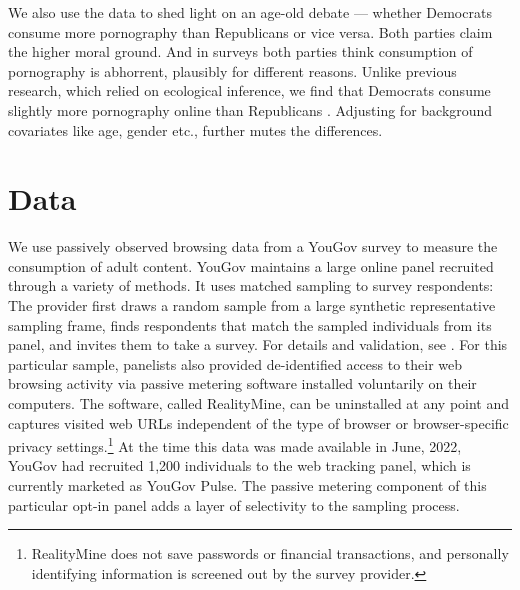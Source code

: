 \documentclass[12pt, letterpaper]{article}
\begin{document}
We also use the data to shed light on an age-old debate --- whether Democrats consume more pornography than Republicans or vice versa. Both parties claim the higher moral ground. And in surveys both parties think consumption of pornography is abhorrent, plausibly for different reasons. Unlike previous research, which relied on ecological inference, we find that Democrats consume slightly more pornography online than Republicans \citep{macinnis2015american, edelman2009markets}. Adjusting for background covariates like age, gender etc., further mutes the differences.

\section*{Data}\label{sec:data}
We use passively observed browsing data from a YouGov survey to measure the consumption of adult content. YouGov maintains a large online panel recruited through a variety of methods. It uses matched sampling to survey respondents: The provider first draws a random sample from a large synthetic representative sampling frame, finds respondents that match the sampled individuals from its panel, and invites them to take a survey. For details and validation, see \citet{rivers2009}. For this particular sample, panelists also provided de-identified access to their web browsing activity via passive metering software installed voluntarily on their computers. The software, called RealityMine, can be uninstalled at any point and captures visited web URLs independent of the type of browser or browser-specific privacy settings.\footnote{RealityMine does not save passwords or financial transactions, and personally identifying information is screened out by the survey provider.} At the time this data was made available in June, 2022, YouGov had recruited 1,200 individuals to the web tracking panel, which is currently marketed as YouGov Pulse. The passive metering component of this particular opt-in panel adds a layer of selectivity to the sampling process. 
\end{document}
